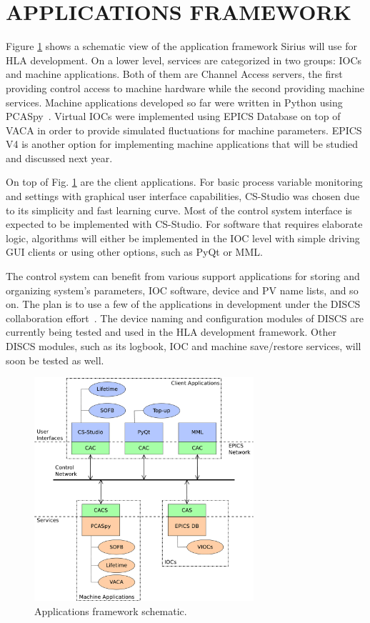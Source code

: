 \documentclass[a4paper,
              ]{jacow}
\begin{document}
\section{APPLICATIONS FRAMEWORK}
Figure \ref{fig:f1} shows a schematic view of the application framework Sirius will use for HLA development. On a lower level, services are categorized in two groups: IOCs and machine applications. Both of them are Channel Access servers, the first providing control access to machine hardware while the second providing machine services. Machine applications developed so far were written in Python using PCASpy~\cite{pcaspy}. Virtual IOCs were implemented using EPICS Database on top of VACA in order to provide simulated fluctuations for machine parameters. EPICS V4 is another option for implementing machine applications that will be studied and discussed next year.

On top of Fig. \ref{fig:f1} are the client applications. For basic process variable monitoring and settings with graphical user interface capabilities, CS-Studio was chosen due to its simplicity and fast learning curve. Most of the control system interface is expected to be implemented with CS-Studio. For software that requires elaborate logic, algorithms will either be implemented in the IOC level with simple driving GUI clients or using other options, such as PyQt or MML.

The control system can benefit from various support applications for storing and organizing system's parameters, IOC software, device and PV name lists, and so on. The plan is to use a few of the applications in development under the DISCS collaboration effort~\cite{discs_article,discs_openepics}. The device naming and configuration modules of DISCS are currently being tested and used in the HLA development framework. Other DISCS modules, such as its logbook, IOC  and machine save/restore services, will soon be tested as well.

\begin{figure}[!htb]
  \centering
  \includegraphics*[width=230pt]{WEPOPRPO22f1}
  \caption{Applications framework schematic.}
  \label{fig:f1}
\end{figure}
\end{document}
